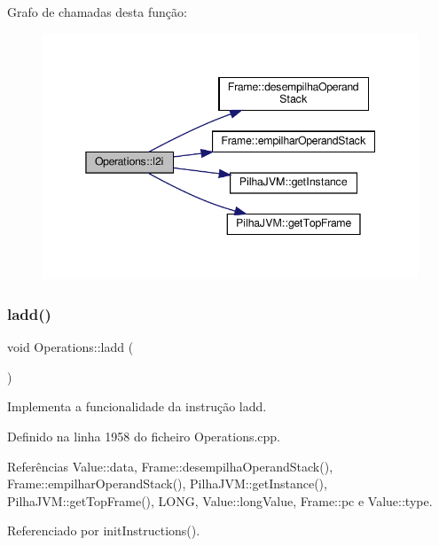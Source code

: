 Grafo de chamadas desta função\+:
\nopagebreak
\begin{figure}[H]
\begin{center}
\leavevmode
\includegraphics[width=345pt]{classOperations_ad5820d99e67f4856e110685b775c5e9b_cgraph}
\end{center}
\end{figure}
\mbox{\label{classOperations_ad4b153d687baa98c26fcfe7c24e12f45}} 
\subsubsection{\texorpdfstring{ladd()}{ladd()}}
{\footnotesize\ttfamily void Operations\+::ladd (\begin{DoxyParamCaption}{ }\end{DoxyParamCaption})\hspace{0.3cm}{\ttfamily [private]}}



Implementa a funcionalidade da instrução ladd. 



Definido na linha 1958 do ficheiro Operations.\+cpp.



Referências Value\+::data, Frame\+::desempilha\+Operand\+Stack(), Frame\+::empilhar\+Operand\+Stack(), Pilha\+J\+V\+M\+::get\+Instance(), Pilha\+J\+V\+M\+::get\+Top\+Frame(), L\+O\+NG, Value\+::long\+Value, Frame\+::pc e Value\+::type.



Referenciado por init\+Instructions().


